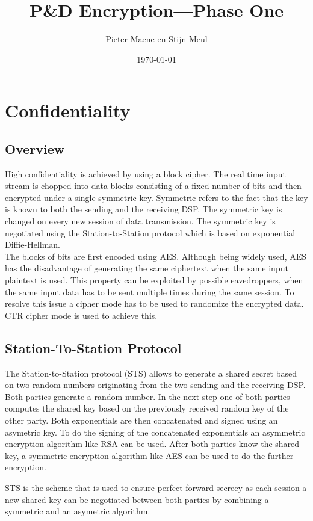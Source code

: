 \documentclass[a4paper]{article}
\title{P\&D Encryption---Phase One}
\author{Pieter Maene en Stijn Meul}
\date{\today}
\begin{document}
\maketitle

\section{Confidentiality}

\subsection{Overview}
High confidentiality is achieved by using a block cipher. The real time input stream is chopped into data blocks consisting of a fixed number of bits and then encrypted under a single symmetric key. Symmetric refers to the fact that the key is known to both the sending and the receiving DSP. The symmetric key is changed on every new session of data transmission. The symmetric key is negotiated using the Station-to-Station protocol which is based on exponential Diffie-Hellman.\\

The blocks of bits are first encoded using AES. Although being widely used, AES has the disadvantage of generating the same ciphertext when the same input plaintext is used. This property can be exploited by possible eavedroppers, when the same input data has to be sent multiple times during the same session. To resolve this issue a cipher mode has to be used to randomize the encrypted data. CTR cipher mode is used to achieve this. 

\subsection{Station-To-Station Protocol}
The Station-to-Station protocol (STS) allows to generate a shared secret based on two random numbers originating from the two sending and the receiving DSP. Both parties generate a random number. In the next step one of both parties computes the shared key based on the previously received random key of the other party. Both exponentials are then concatenated and signed using an asymetric key. To do the signing of the concatenated exponentials an asymmetric encryption algorithm like RSA can be used. After both parties know the shared key, a symmetric encryption algorithm like AES can be used to do the further encryption.

STS is the scheme that is used to ensure perfect forward secrecy as each session a new shared key can be negotiated between both parties by combining a symmetric and an asymetric algorithm.
\end{document}
